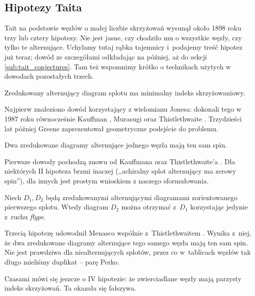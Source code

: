 
\subsection{Hipotezy Taita}
%

Tait na podstawie węzłów o małej liczbie skrzyżowań  wysunął około 1898 roku trzy lub cztery hipotezy.
Nie jest jasne, czy chodziło mu o wszystkie węzły, czy tylko te alternujące.
Uchylamy tutaj rąbka tajemnicy i~podajemy treść hipotez już teraz; dowód ze szczegółami odkładając na później, aż do sekcji \ref{sub:tait_conjectures}.
Tam też wspomnimy krótko o technikach użytych w dowodach pozostałych trzech.

\begin{conjecture}
%
\label{con:tait_1}%
    Zredukowany alternujący diagram splotu ma minimalny indeks skrzyżowaniowy.
\end{conjecture}

Najpierw znaleziono dowód korzystający z wielomianu Jonesa: dokonali tego w 1987 roku równocześnie Kauffman \cite{kauffman1987}, Murasugi \cite{murasugi1987} oraz Thistlethwaite \cite{thistlethwaite1987}.
%
%
%
Trzydzieści lat później Greene \cite{greene2017} zaprezentował geometryczne podejście do problemu.
%

\begin{conjecture}
%
    Dwa zredukowane diagramy alternujące jednego węzła mają ten sam spin.
\end{conjecture}

Pierwsze dowody pochodzą znowu od Kauffmana \cite{kauffman1987} oraz Thistlethwaite'a \cite{thistlethwaite1987}.
%
%
Dla niektórych II hipoteza brzmi inaczej (,,achiralny splot alternujący ma zerowy spin''), dla innych jest prostym wnioskiem z naszego sformułowania.

\begin{conjecture}
%
    Niech $D_1, D_2$ będą zredukowanymi alternującymi diagramami zorientowanego pierwszego splotu.
    Wtedy diagram $D_2$ można otrzymać z~$D_1$ korzystając jedynie z~ruchu \emph{flype}.
\end{conjecture}

Trzecią hipotezę udowodnił Menasco wspólnie z~Thistlethwaitem \cite{menasco1993}.
%
%
Wynika z~niej, że dwa zredukowane diagramy alternujące tego samego węzła mają ten sam spin.
Nie jest prawdziwa dla niealternujących splotów, przez co w~tablicach węzłów tak długo mieliśmy duplikat -- parę Perko.
%

Czasami mówi się jeszcze o IV hipotezie: że zwierciadlane węzły mają parzysty indeks skrzyżowań.
Ta okazała się fałszywa.

%



